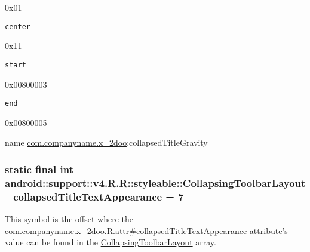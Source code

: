 0x01

{\tt center}

0x11

{\tt start}

0x00800003

{\tt end}

0x00800005

name \hyperlink{namespacecom_1_1companyname_1_1x__2doo}{com.companyname.x\_\-2doo}:collapsedTitleGravity \hypertarget{classandroid_1_1support_1_1v4_1_1_r_1_1styleable_36b5814dff9ad7add6371c9f816f66f0}{
\subsubsection[{CollapsingToolbarLayout\_\-collapsedTitleTextAppearance}]{\setlength{\rightskip}{0pt plus 5cm}static final int android::support::v4.R.R::styleable::CollapsingToolbarLayout\_\-collapsedTitleTextAppearance = 7}}
\label{classandroid_1_1support_1_1v4_1_1_r_1_1styleable_36b5814dff9ad7add6371c9f816f66f0}


This symbol is the offset where the \hyperlink{classcom_1_1companyname_1_1x__2doo_1_1_r_1_1attr_97eedc6db18d59049792e15dd8b3d512}{com.companyname.x\_\-2doo.R.attr\#collapsedTitleTextAppearance} attribute's value can be found in the \hyperlink{classandroid_1_1support_1_1v4_1_1_r_1_1styleable_aa101903fcf4b45a3b7fee0a0abc5ea8}{CollapsingToolbarLayout} array.

